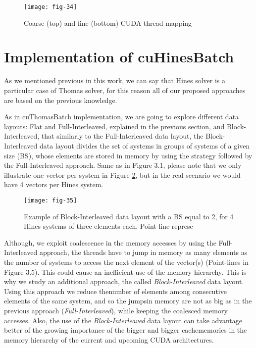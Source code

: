  
 \vspace{1ex}
 \begin{figure}[htbp]
    \centering
    \texttt{[image: fig-34]}
    \caption{Coarse (top) and fine (bottom) CUDA thread mapping}
    \label{fig:fig-34}
\end{figure}


\vspace{10ex}
\section{Implementation of cuHinesBatch}
As we mentioned previous in this work, we can say that Hines solver is a particular
case of Thomas solver, for this reason all of our proposed approaches are based on the
previous knowledge.

As in cuThomasBatch implementation, we are going to explore different data layouts: Flat and Full-Interleaved, explained in the previous section, and Block-Interleaved,
that similarly to the Full-Interleaved data layout, the Block-Interleaved data layout divides the set of systems in groups of systems of a given size (BS), whose elements are
stored in memory by using the strategy followed by the Full-Interleaved approach.
Same as in Figure 3.1, please note that we only illustrate one vector per system in
Figure \ref{fig:fig-35}, but in the real scenario we would have 4 vectors per Hines system.

\vspace{1ex}
\begin{figure}[htbp]
   \centering
   \texttt{[image: fig-35]}
   \caption{Example of Block-Interleaved data layout with a BS equal to 2, for 4 Hines
    systems of three elements each. Point-line represe}
   \label{fig:fig-35}
\end{figure}

Although, we exploit coalescence in the memory accesses by using the Full-Interleaved
approach, the threads have to jump in memory as many elements as the number of systems to access the next element of the vector(s) (Point-lines in Figure 3.5). This could
cause an inefficient use of the memory hierarchy. This is why we study an
 additional approach, the called \textit{Block-Interleaved} data layout.  
 Using this approach we reduce thenumber of elements among consecutive
  elements of the same system, and so the jumpsin memory are not as big
   as in the previous approach (\textit{Full-Interleaved}), 
   while keeping the coalesced memory accesses.  Also, the use of the
   \textit{Block-Interleaved} data layout can take advantage better of the 
    growing importance of the bigger and bigger cachememories in the
     memory hierarchy of the current and upcoming CUDA architectures.

